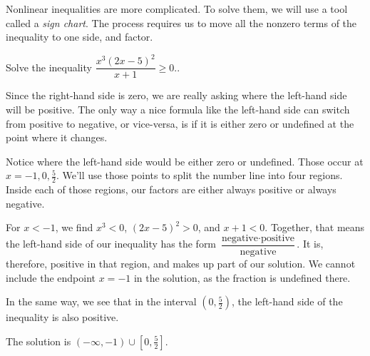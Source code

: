 \documentclass{ximera}
\begin{document}
Nonlinear inequalities are more complicated.  To solve them, we will use a tool called a \emph{sign chart}.
The process requires us to move all the nonzero terms of the inequality to one side, and factor.
\begin{example}
	Solve the inequality $\displaystyle \dfrac{x^3 \left(2x-5\right)^2}{x+1} \geq 0.$.

	\begin{explanation}
		Since the right-hand side is zero, we are really asking where the left-hand side will be positive.  The only way
		a nice formula like the left-hand side can switch from positive to negative, or vice-versa, is if it is either zero
		or undefined at the point where it changes.

		Notice where the left-hand side would be either zero or undefined.  Those occur at $x = -1, 0, \frac{5}{2}$.  
		We'll use those points to split the number line into four regions. Inside each of those regions, our factors are either
		always positive or always negative.
		
		
		For $x < -1$, we find $x^3 < 0$, $(2x-5)^2 > 0$, and $x+1 < 0$.  Together, that means the left-hand side of our inequality has the form 
		$\displaystyle \dfrac{ \textrm{negative} \cdot \textrm{positive}}{\textrm{negative}}$.  It is, therefore, positive in that region, and makes up
		part of our solution.  We cannot include the endpoint $x=-1$ in the solution, as the fraction is undefined there.
		
		In the same way, we see that in the interval $\left( 0, \frac{5}{2} \right)$, the left-hand side of the inequality is also positive.  
		
		The solution is $\left( -\infty, -1 \right) \cup \left[ 0, \frac{5}{2} \right]$.
	\end{explanation}
\end{example}
\end{document}
